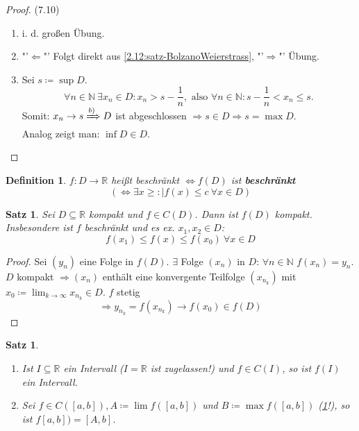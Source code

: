 \documentclass[12pt]{extreport} %
\newcommand{\N}{\mathbb{N}}
\newcommand{\R}{\mathbb{R}}
\theoremstyle{named}
\theoremstyle{dotless}
\newtheorem{satz}[unnamedtheorem]{Satz}
\newtheorem*{definition}{Definition}
\begin{document}
\begin{proof}(7.10)
	\begin{enumerate}
		\item i. d. gro{\ss}en Übung.
		\item "'$\Leftarrow$"' Folgt direkt aus \ref{2.12:satz-BolzanoWeierstrass}, "'$\Rightarrow$"' Übung.
		\item Sei $s \coloneqq \sup D$. 
			$$ \forall n \in \N ~\exists x_{n} \in D: x_{n} > s - \frac{1}{n}, \text{ also } \forall n \in \N: s - \frac{1}{n} < x_{n} \leq s. $$
			 Somit: $x_{n} \rightarrow s \xRightarrow[]{b)} D$ ist abgeschlossen $\Rightarrow s \in D \Rightarrow s = \max D$. \\
			 Analog zeigt man: $\inf D \in D$.
	\end{enumerate}	
\end{proof}

\begin{definition}
	$f \colon D \rightarrow \R$ hei{\ss}t beschränkt $\iff f(D)$ ist \textbf{beschränkt} $$ (\iff \exists x \geq : |f(x) \leq c ~\forall x \in D) $$
\end{definition}


\begin{satz} \label{7.11:satz}
	Sei $D \subseteq \R$ kompakt und $f \in C(D)$. Dann ist $f(D)$ kompakt. Insbesondere ist $f$ beschränkt	und es ex. $x_{1}, x_{2} \in D$: 
		$$ f(x_{1}) \leq f(x) \leq f(x_{0}) ~\forall x \in D $$
\end{satz}

\begin{proof}
	Sei $(y_{n})$ eine Folge in $f(D)$. $\exists$ Folge $(x_{n})$ in $D$: $\forall n \in \N$ $f(x_{n}) = y_{n}$. $D$ kompakt $\Rightarrow (x_{n})$ enthält eine konvergente Teilfolge $(x_{n_{k}})$ mit $x_{0} \coloneqq \lim_{k \rightarrow \infty} x_{n_{k}} \in D$. $f$ stetig 
	$$ \Rightarrow y_{n_{k}} = f(x_{n_{k}}) \rightarrow f(x_{0}) \in f(D) $$
\end{proof}


\begin{satz} ~\ \label{7.12:satz}
	\begin{enumerate}
		\item Ist $I \subseteq \R$ ein Intervall ($I = \R$ ist zugelassen!) und $f \in C(I)$, so ist $f(I)$ ein Intervall.
		\item Sei $f \in C([a, b]), A \coloneqq \lim f([a, b])$ und $B \coloneqq \max f([a, b])$ (\ref{7.11:satz}!), so ist $f[a, b]) = [A, b]$.
	\end{enumerate}
\end{satz}
\end{document}
